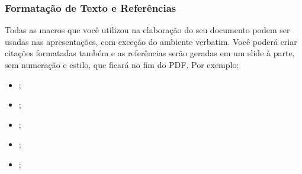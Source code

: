 \begin{frame}

    \frametitle{Formatação de Texto e Referências}
    
    Todas as macros que você utilizou na elaboração do seu documento podem ser usadas nas apresentações, com exceção do ambiente verbatim. Você poderá criar citações formatadas também e as referências serão geradas em um slide à parte, sem numeração e estilo, que ficará no fim do PDF. Por exemplo:
    
    \begin{itemize}
        \item \cite{Abedi2014, Agaisse1995};
        \item \cite{AgapitoTenfen2014, BtNomenclature2016, Nelson2014};
        \item {};
        \item {};
        \item {};
    \end{itemize}
         
\end{frame}
